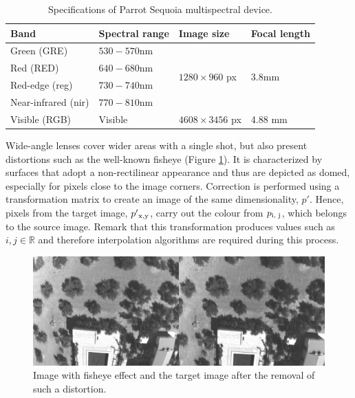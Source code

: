 \renewcommand{\arraystretch}{1.2}
\begin{table}[ht]
    \caption{Specifications of Parrot Sequoia multispectral device.}
    \label{table:parrot_sequoia}
    \begin{tabular}{llll}
        \toprule
        Band & Spectral range & Image size & Focal length\\
        \midrule
        Green (GRE) & $530-570 \si{\nano\meter}$ & \multirow{4}{*}{$1280 \times 960$ px} & \multirow{4}{*}{3.8\si{\milli\meter}}\\
        Red (RED) & $640-680 \si{\nano\meter}$ & & \\
        Red-edge (\acrshort{reg}) & $730-740 \si{\nano\meter}$ & & \\
        Near-infrared (\acrshort{nir}) & $770-810 \si{\nano\meter}$ & &\\
        \cmidrule{1-4}
        Visible (RGB) & Visible & $4608 \times 3456$ px & 4.88 \si{\milli\meter}\\
        \bottomrule
    \end{tabular}
\end{table}
\renewcommand{\arraystretch}{1}

Wide-angle lenses cover wider areas with a single shot, but also present distortions such as the well-known fisheye (Figure \ref{fig:fisheye_sample}). It is characterized by surfaces that adopt a non-rectilinear appearance and thus are depicted as domed, especially for pixels close to the image corners. Correction is performed using a transformation matrix to create an image of the same dimensionality, $p'$. Hence, pixels from the target image, $p'\textsubscript{x,y}$, carry out the colour from $p\textsubscript{i, j}$, which belongs to the source image. Remark that this transformation produces values such as $i, j \in \mathbb{R}$ and therefore interpolation algorithms are required during this process.

\begin{figure}[ht]
	\includegraphics{figs/materials/fisheye_sample.png}
	\caption{Image with fisheye effect and the target image after the removal of such a distortion.}
	\label{fig:fisheye_sample}
\end{figure}

